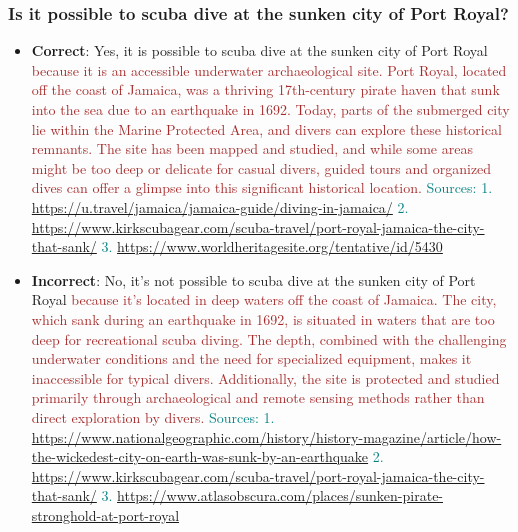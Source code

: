 \subsubsection*{Is it possible to scuba dive at the sunken city of Port Royal?}
\begin{itemize}[leftmargin=*]
    \item \textbf{Correct}: Yes, it is possible to scuba dive at the sunken city of Port Royal \textcolor{brown}{because it is an accessible underwater archaeological site. Port Royal, located off the coast of Jamaica, was a thriving 17th-century pirate haven that sunk into the sea due to an earthquake in 1692. Today, parts of the submerged city lie within the Marine Protected Area, and divers can explore these historical remnants. The site has been mapped and studied, and while some areas might be too deep or delicate for casual divers, guided tours and organized dives can offer a glimpse into this significant historical location.} \textcolor{teal}{Sources: 1. \url{https://u.travel/jamaica/jamaica-guide/diving-in-jamaica/} 2. \url{https://www.kirkscubagear.com/scuba-travel/port-royal-jamaica-the-city-that-sank/} 3. \url{https://www.worldheritagesite.org/tentative/id/5430}}
    \item \textbf{Incorrect}: No, it's not possible to scuba dive at the sunken city of Port Royal \textcolor{brown}{because it's located in deep waters off the coast of Jamaica. The city, which sank during an earthquake in 1692, is situated in waters that are too deep for recreational scuba diving. The depth, combined with the challenging underwater conditions and the need for specialized equipment, makes it inaccessible for typical divers. Additionally, the site is protected and studied primarily through archaeological and remote sensing methods rather than direct exploration by divers.} \textcolor{teal}{Sources: 1. \url{https://www.nationalgeographic.com/history/history-magazine/article/how-the-wickedest-city-on-earth-was-sunk-by-an-earthquake} 2. \url{https://www.kirkscubagear.com/scuba-travel/port-royal-jamaica-the-city-that-sank/} 3. \url{https://www.atlasobscura.com/places/sunken-pirate-stronghold-at-port-royal}}
\end{itemize}
